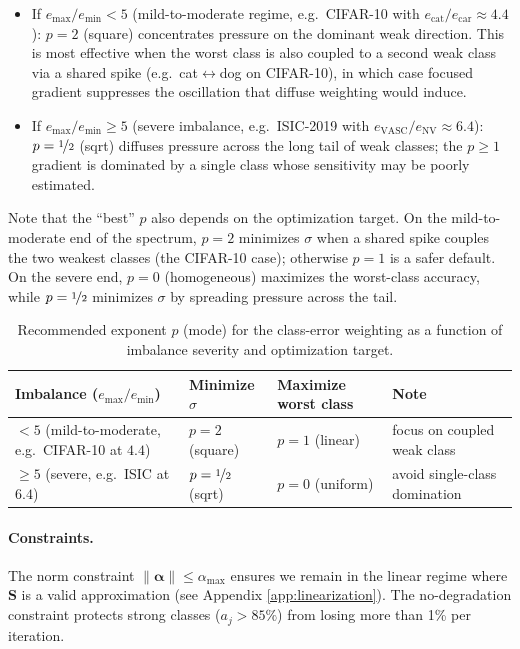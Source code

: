 \documentclass[11pt,a4paper]{article}
\newcommand{\norm}[1]{\lVert #1 \rVert}
\newcommand{\mat}[1]{\bm{#1}}
\newcommand{\vect}[1]{\bm{#1}}
\begin{document}
\begin{itemize}
  \item If $e_{\max}/e_{\min} < 5$ (mild-to-moderate regime, e.g.\
    CIFAR-10 with $e_{\mathrm{cat}}/e_{\mathrm{car}} \approx 4.4$):
    $p = 2$ (square) concentrates pressure on the dominant weak
    direction. This is most effective when the worst class is also
    coupled to a second weak class via a shared spike (e.g.\ cat$\leftrightarrow$dog
    on CIFAR-10), in which case focused gradient suppresses the
    oscillation that diffuse weighting would induce.
  \item If $e_{\max}/e_{\min} \geq 5$ (severe imbalance, e.g.\
    ISIC-2019 with $e_{\mathrm{VASC}}/e_{\mathrm{NV}} \approx 6.4$):
    $p = \nicefrac{1}{2}$ (sqrt) diffuses pressure across the long tail
    of weak classes; the $p \geq 1$ gradient is dominated by a single
    class whose sensitivity may be poorly estimated.
\end{itemize}

Note that the ``best'' $p$ also depends on the optimization target.
On the mild-to-moderate end of the spectrum, $p = 2$ minimizes
$\sigma$ when a shared spike couples the two weakest classes (the
CIFAR-10 case); otherwise $p = 1$ is a safer default. On the severe
end, $p = 0$ (homogeneous) maximizes the worst-class accuracy, while
$p = \nicefrac{1}{2}$ minimizes $\sigma$ by spreading pressure across
the tail.

\begin{table}[ht]
\centering
\caption{Recommended exponent $p$ (mode) for the class-error weighting
  as a function of imbalance severity and optimization target.}
\label{tab:p-rule}
\begin{tabular}{llll}
\toprule
Imbalance ($e_{\max}/e_{\min}$) & Minimize $\sigma$ & Maximize worst class & Note \\
\midrule
$< 5$ (mild-to-moderate, e.g.\ CIFAR-10 at $4.4$) & $p=2$ (square) & $p=1$ (linear) & focus on coupled weak class \\
$\geq 5$ (severe, e.g.\ ISIC at $6.4$) & $p=\nicefrac{1}{2}$ (sqrt) & $p=0$ (uniform) & avoid single-class domination \\
\bottomrule
\end{tabular}
\end{table}

\paragraph{Constraints.}
The norm constraint $\norm{\vect{\alpha}} \leq \alpha_{\max}$ ensures
we remain in the linear regime where $\mat{S}$ is a valid
approximation (see Appendix \ref{app:linearization}). The no-degradation constraint protects strong classes
($a_j > 85\%$) from losing more than 1\% per iteration.
\end{document}

